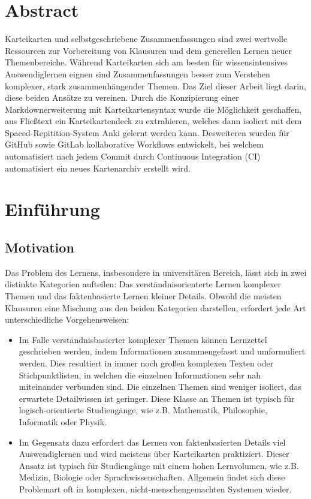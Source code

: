 \documentclass[ngerman]{article}
\begin{document}
\maketitle
\section*{Abstract}
Karteikarten und selbstgeschriebene Zusammenfassungen sind zwei wertvolle Ressourcen zur Vorbereitung von Klausuren und dem generellen Lernen neuer Themenbereiche. Während Karteikarten sich am besten für wissensintensives Auswendiglernen eignen sind Zusammenfassungen besser zum Verstehen komplexer, stark zusammenhängender Themen. Das Ziel dieser Arbeit liegt darin, diese beiden Ansätze zu vereinen. Durch die Konzipierung einer Markdownerweiterung mit Karteikartensyntax wurde die Möglichkeit geschaffen, aus Fließtext ein Karteikartendeck zu extrahieren, welches dann isoliert mit dem Spaced-Repitition-System Anki gelernt werden kann. Desweiteren wurden für GitHub sowie GitLab kollaborative Workflows entwickelt, bei welchem automatisiert nach jedem Commit durch Continuous Integration (CI) automatisiert ein neues Kartenarchiv erstellt wird.
\tableofcontents
\newpage


\section{Einführung}
\subsection{Motivation}
Das Problem des Lernens, insbesondere in universitären Bereich, lässt sich in zwei distinkte Kategorien aufteilen: Das verständnisorienterte Lernen komplexer Themen und das faktenbasierte Lernen kleiner Details. Obwohl die meisten Klausuren eine Mischung aus den beiden Kategorien darstellen, erfordert jede Art unterschiedliche Vorgehensweisen:

\begin{itemize}
\item Im Falle verständnisbasierter komplexer Themen können Lernzettel geschrieben werden, indem Informationen zusammengefasst und umformuliert werden. Dies resultiert in immer noch großen komplexen Texten oder Stichpunktlisten, in welchen die einzelnen Informationen sehr nah miteinander verbunden sind. Die einzelnen Themen sind weniger isoliert, das erwartete Detailwissen ist geringer. Diese Klasse an Themen ist typisch für logisch-orientierte Studiengänge, wie z.B. Mathematik, Philosophie, Informatik oder Physik.
\item Im Gegensatz dazu erfordert das Lernen von faktenbasierten Details viel Auswendiglernen und wird meistens über Karteikarten praktiziert. Dieser Ansatz ist typisch für Studiengänge mit einem hohen Lernvolumen, wie z.B. Medizin, Biologie oder Sprachwissenschaften. Allgemein findet sich diese Problemart oft in komplexen, nicht-menschengemachten Systemen wieder.
\end{itemize}
\end{document}
